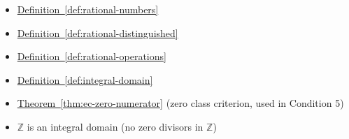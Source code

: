 \begin{dependencies}
\begin{itemize}
  \item \hyperref[def:rational-numbers]{Definition~\ref*{def:rational-numbers}}
  \item \hyperref[def:rational-distinguished]{Definition~\ref*{def:rational-distinguished}}
  \item \hyperref[def:rational-operations]{Definition~\ref*{def:rational-operations}}
  \item \hyperref[def:integral-domain]{Definition~\ref*{def:integral-domain}}
  \item \hyperref[thm:ec-zero-numerator]{Theorem~\ref*{thm:ec-zero-numerator}}
        \textnormal{(zero class criterion, used in Condition 5)}
  \item $\mathbb{Z}$ is an integral domain (no zero divisors in $\mathbb{Z}$)
\end{itemize}
\end{dependencies}
